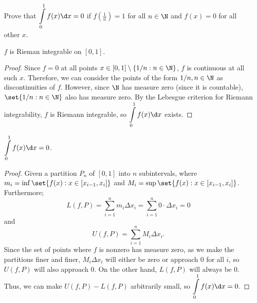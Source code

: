 \begin{problem}
  Prove that $\displaystyle \int\limits_0^1 f(x) \d x = 0$ if
  $f(\frac{1}{n})= 1$ for all $n \in \N$ and $f(x) = 0$ for all other $x$.
\end{problem}

\begin{claim}
  $f$ is Rieman integrable on $[0, 1]$.
\end{claim}

\begin{proof}
  Since $f = 0$ at all points $x \in [0, 1] \setminus \{1/n : n \in \N\}$,
  $f$ is continuous at all such $x$. Therefore, we can consider
  the points of the form $1/n, n \in \N$ as discontinuities of $f$.
  However, since $\N$ has measure zero (since it is countable),
  $\set{1/n : n \in \N}$ also has measure zero.
  By the Lebesgue criterion for Riemann integrability, $f$ is Riemann integrable,
  so $\displaystyle \int\limits_0^1 f(x) \d x$ exists.
\end{proof}

\begin{claim}
  $\displaystyle \int\limits_0^1 f(x) \d x = 0$.
\end{claim}
\begin{proof}
  Given a partition $P_n$ of $[0, 1]$ into $n$ subintervals,
  \blue{\[
    L(f, P) = \sum_{i=1}^n m_i \Delta x_i
            \leq \int \limits_0^1 f(x) \d x
            \leq \sum_{i=1}^n M_i \Delta x_i
            = U(f, P),
  \]}
  where $m_i = \inf\set{f(x) : x \in [x_{i-1}, x_i]}$ and
  $M_i = \sup\set{f(x) : x \in [x_{i-1}, x_i]}$.
  Furthermore;
  \begin{equation}
    L(f, P) = \sum_{i=1}^n m_i \Delta x_i
            = \sum_{i=1}^n 0 \cdot \Delta x_i
            = 0
  \end{equation}
  and
  \begin{equation}
    U(f, P) = \sum_{i=1}^n M_i \Delta x_i.
  \end{equation}
  Since the set of points where $f$ is nonzero has measure zero,
  as we make the partitions finer and finer, $M_i \Delta x_i$ will
  either be zero or approach $0$ for all $i$, so $U(f, P)$ will also approach $0$.
  On the other hand, $L(f, P)$ will always be $0$.
  Thus, we can make $U(f, P) - L(f, P)$ arbitrarily small,
  so $\displaystyle \int\limits_0^1 f(x) \d x = 0$.
\end{proof}
